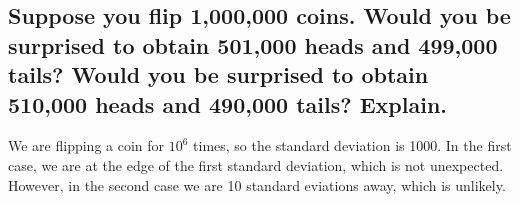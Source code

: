 \documentclass[answers]{exam}
\begin{document}
\begin{questions}
\begin{parts}
	\part{Suppose you flip 1,000,000 coins. Would you be surprised to obtain 501,000 heads and 499,000 tails? Would you be surprised to obtain 510,000 heads and 490,000 tails? Explain.}

	\begin{solution}
		We are flipping a coin for $10^6$ times, so the standard deviation is 1000. In the first case, we are at the edge of the first standard deviation, which is not unexpected. However, in the second case we are 10 standard eviations away, which is unlikely.
	\end{solution}
\end{parts}

\end{questions}
\end{document}
